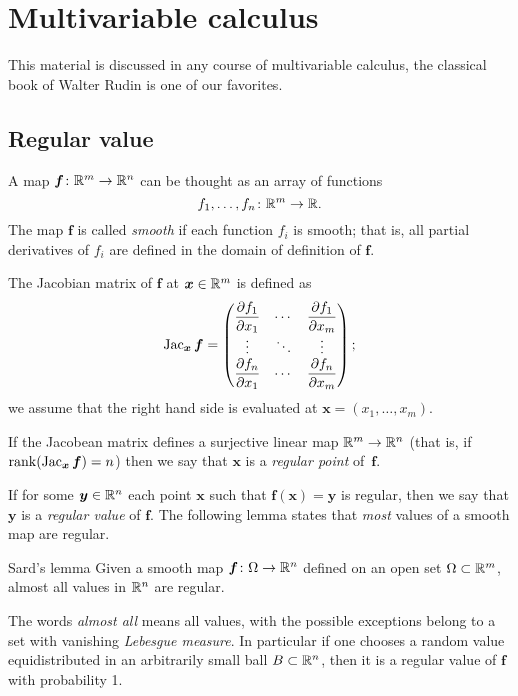 \section{Multivariable calculus}

This material is discussed in any course of multivariable calculus, the classical book of Walter Rudin \cite{rudin} is one of our favorites.

\subsection*{Regular value}

A map $\bm{f}\colon\mathbb{R}^m\to\mathbb{R}^n$ can be thought as an array of functions 
\[f_1,\dots,f_n\colon\mathbb{R}^m\to \mathbb{R}.\]
The map $\bm{f}$ is called \emph{smooth} if each function $f_i$ is smooth;
that is, all partial derivatives of $f_i$ are defined in the domain of definition of $\bm{f}$.

The Jacobian matrix of $\bm{f}$ at $\bm{x}\in\mathbb{R}^m$ is defined as
\[\mathop{\rm Jac}\nolimits_{\bm{x}}\bm{f}=
\begin{pmatrix}
\dfrac{\partial f_1}{\partial x_1} & \cdots & \dfrac{\partial f_1}{\partial x_m}\\
\vdots & \ddots & \vdots\\
\dfrac{\partial f_n}{\partial x_1} & \cdots & \dfrac{\partial f_n}{\partial x_m} \end{pmatrix};\]
we assume that the right hand side is evaluated at $\bm{x}=(x_1,\dots,x_m)$.

If the Jacobean matrix defines a surjective linear map $\mathbb{R}^m\to\mathbb{R}^n$ (that is, if $\mathop{\rm rank}\nolimits(\mathop{\rm Jac}\nolimits_{\bm{x}}\bm{f})=n$) then we say that 
$\bm{x}$ is a \emph{regular point} of~$\bm{f}$.

If for some $\bm{y}\in \mathbb{R}^n$ each point $\bm{x}$ such that $\bm{f}(\bm{x})=\bm{y}$ is regular,
then we say that $\bm{y}$ is a \emph{regular value} of $\bm{f}$.
The following lemma states that {}\emph{most} values of a smooth map are regular.

\begin{thm}{Sard's lemma}\label{lem:sard}
Given a smooth map $\bm{f}\colon \Omega \z\to \RR^n$ defined on an open set $\Omega\subset \mathbb{R}^m$, almost all values in $\mathbb{R}^n$ are regular.
\end{thm}

The words \emph{almost all} means all values, with the possible exceptions belong to a set with vanishing {}\emph{Lebesgue measure}.
In particular if one chooses a random value equidistributed in an arbitrarily small ball $B\subset \mathbb{R}^n$, then it is a regular value of $\bm{f}$ with probability 1.

